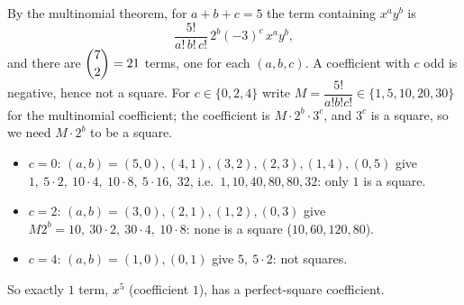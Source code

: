 By the multinomial theorem, for $a+b+c=5$ the term containing $x^ay^b$ is
\[
\dfrac{5!}{a!\,b!\,c!}\,2^b(-3)^c\,x^ay^b ,
\]
and there are $\dbinom{7}{2}=21$ terms, one for each $(a,b,c)$. A coefficient with $c$ odd is negative, hence not a square. For $c\in\{0,2,4\}$ write $M=\dfrac{5!}{a!b!c!}\in\{1,5,10,20,30\}$ for the multinomial coefficient; the coefficient is $M\cdot2^b\cdot3^c$, and $3^c$ is a square, so we need $M\cdot2^b$ to be a square.
\begin{itemize}
\item $c=0$: $(a,b)=(5,0),(4,1),(3,2),(2,3),(1,4),(0,5)$ give $1,\ 5\cdot2,\ 10\cdot4,\ 10\cdot8,\ 5\cdot16,\ 32$, i.e.\ $1,10,40,80,80,32$: only $1$ is a square.
\item $c=2$: $(a,b)=(3,0),(2,1),(1,2),(0,3)$ give $M2^b=10,\ 30\cdot2,\ 30\cdot4,\ 10\cdot8$: none is a square ($10,60,120,80$).
\item $c=4$: $(a,b)=(1,0),(0,1)$ give $5,\ 5\cdot2$: not squares.
\end{itemize}
So exactly $\boxed{1}$ term, $x^5$ (coefficient $1$), has a perfect-square coefficient.
